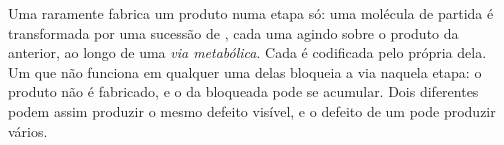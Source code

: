 \begin{proposition}\label{prop:g11:enzymes-and-phenotype:pathway}
Uma  raramente fabrica um produto numa etapa só: uma molécula de
partida é transformada por uma sucessão de , cada uma agindo
sobre o produto da anterior, ao longo de uma
\emph{via metabólica}. Cada  é codificada
pelo  própria dela. Um  que não funciona em qualquer uma delas
bloqueia a via naquela etapa: o produto não é fabricado, e o 
da  bloqueada pode se acumular. Dois  diferentes podem
assim produzir o mesmo defeito visível, e o defeito de um  pode
produzir vários.
\end{proposition}
\admitted

